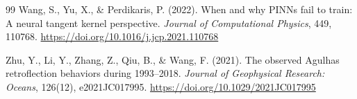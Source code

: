 \documentclass[11pt]{article}
\begin{document}
\begin{thebibliography}{99}
 Wang, S., Yu, X., \& Perdikaris, P. (2022). When and why PINNs fail to train: A neural tangent kernel perspective. \textit{Journal of Computational Physics}, 449, 110768. \url{https://doi.org/10.1016/j.jcp.2021.110768}

 Zhu, Y., Li, Y., Zhang, Z., Qiu, B., \& Wang, F. (2021). The observed Agulhas retroflection behaviors during 1993--2018. \textit{Journal of Geophysical Research: Oceans}, 126(12), e2021JC017995. \url{https://doi.org/10.1029/2021JC017995}

\end{thebibliography}
\end{document}
